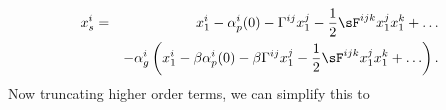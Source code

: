\begin{eqnarray}
x^i_s &=& x^i_1  - \alpha_p^i(0) - \Gamma^{ij}x^j_1 - \frac{1}{2} \sF^{ijk} x^j_1 x^k_1 +\ldots \nonumber\\
&& - \alpha^i_g \left(x^i_1 - \beta\alpha_p^i(0) - \beta \Gamma^{ij} x^j_1 - \frac{1}{2} \sF^{ijk} x^j_1 x^k_1 + \ldots \right).
\end{eqnarray}
\normalsize
Now truncating higher order terms, we can simplify this to